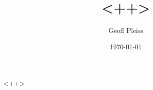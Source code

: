 \documentclass[12pt, letterpaper]{article}
\author{Geoff Pleiss}
\date{\today}
\title{<++>}
\begin{document}
\maketitle
<++>
\end{document}
